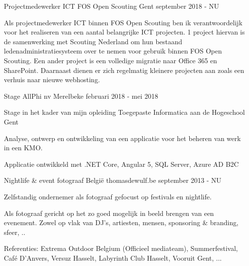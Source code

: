 


\begin{cventries}

\cventry
{Projectmedewerker ICT} %
{FOS Open Scouting} %
{Gent} %
{september 2018 - NU} %
{ %
\begin{cvitems}
\item {Als projectmedewerker ICT binnen FOS Open Scouting ben ik verantwoordelijk voor het realiseren van een aantal belangrijke ICT projecten.
1 project hiervan is de samenwerking met Scouting Nederland om hun bestaand ledenadministratiesysteem over te nemen voor gebruik binnen FOS Open Scouting. Een ander project is een volledige migratie naar Office 365 en SharePoint.
Daarnaast dienen er zich regelmatig kleinere projecten aan zoals een verhuis naar nieuwe webhosting.}
\end{cvitems}
}


\cventry
{Stage} %
{AllPhi nv} %
{Merelbeke} %
{februari 2018 - mei 2018} %
{ %
\begin{cvitems}
\item {Stage in het kader van mijn opleiding Toegepaste Informatica aan de Hogeschool Gent }
\item {Analyse, ontwerp en ontwikkeling van een applicatie voor het beheren van werk in een KMO.}
\item {Applicatie ontwikkeld met .NET Core, Angular 5, SQL Server, Azure AD B2C}
\end{cvitems}
}

\cventry
{Nightlife \& event fotograaf} %
{België} %
{thomasdewulf.be} %
{september 2013 - NU} %
{ %
\begin{cvitems}
\item {Zelfstandig ondernemer als fotograaf gefocust op festivals en nightlife. }
\item {Als fotograaf gericht op het zo goed mogelijk in beeld brengen van een evenement. Zowel op vlak van DJ's, artiesten, mensen, sponsoring \& branding, sfeer, ..}
\item {Referenties: Extrema Outdoor Belgium (Officieel mediateam), Summerfestival, Café D'Anvers, Versuz Hasselt, Labyrinth Club Hasselt, Vooruit Gent, ...}
\end{cvitems}
}


\end{cventries}
